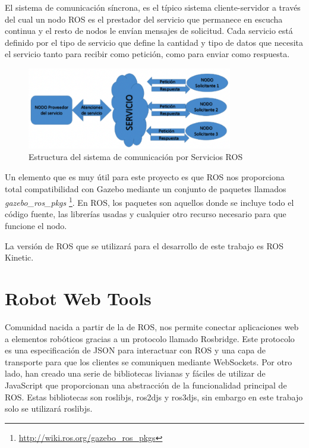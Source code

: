 El sistema de comunicación síncrona, es el típico sistema cliente-servidor a través del cual un nodo ROS es el prestador del servicio que permanece en escucha continua y el resto de nodos le envían mensajes de solicitud. Cada servicio está definido por el tipo de servicio que define la cantidad y tipo de datos que necesita el servicio tanto para recibir como petición, como para enviar como respuesta.

\begin{figure}[H]
  \begin{center}
    \includegraphics[width=0.8\textwidth]{figures/serviciosros.png}
		\caption{Estructura del sistema de comunicación por Servicios ROS}
		\label{fig.serviciosros}
		\end{center}
\end{figure}

Un elemento que es muy útil para este proyecto es que ROS nos proporciona total compatibilidad con Gazebo mediante un conjunto de paquetes llamados \textit{gazebo\_ros\_pkgs} \footnote{\url{http://wiki.ros.org/gazebo_ros_pkgs}}. En ROS, los paquetes son aquellos donde se incluye todo el código fuente, las librerías usadas y cualquier otro recurso necesario para que funcione el nodo.

La versión de ROS que se utilizará para el desarrollo de este trabajo es ROS Kinetic.

\section{Robot Web Tools}
Comunidad nacida a partir de la de ROS, nos permite conectar aplicaciones web a elementos robóticos gracias a un protocolo llamado Rosbridge. Este protocolo es una especificación de JSON para interactuar con ROS y una capa de transporte para que los clientes se comuniquen mediante WebSockets. Por otro lado, han creado una serie de bibliotecas livianas y fáciles de utilizar de JavaScript que proporcionan una  abstracción de la funcionalidad principal de ROS. Estas bibliotecas son roslibjs, ros2djs y ros3djs, sin embargo en este trabajo solo se utilizará roslibjs.

